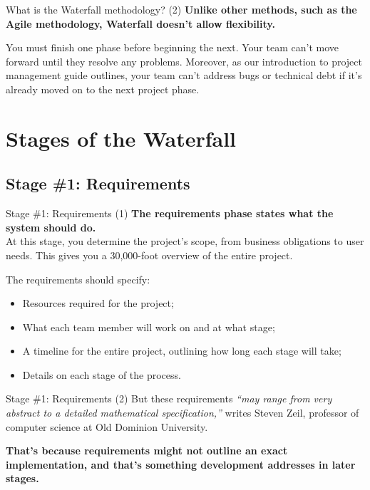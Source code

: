\documentclass[
    notheorems,
    11pt,
    compress,
    aspectratio=169
]{beamer}
\begin{document}
\begin{frame}{What is the Waterfall methodology? (2)}
    \textbf{Unlike other methods, such as the Agile methodology, Waterfall doesn’t allow flexibility.}

    \pause
    \vspace{\baselineskip}

    You must finish one phase before beginning the next. Your team can’t move forward until they resolve any problems. Moreover, as our introduction to project management guide outlines, your team can’t address bugs or technical debt if it’s already moved on to the next project phase.
\end{frame}


\section{Stages of the Waterfall}

\subsection{Stage \#1: Requirements}

\begin{frame}{Stage \#1: Requirements (1)}
    \textbf{The requirements phase states what the system should do.}
    \\
    At this stage, you determine the project’s scope, from business obligations to user needs. This gives you a 30,000-foot overview of the entire project.

    \pause
    \vfill

    The requirements should specify:

    \begin{itemize}
        \item Resources required for the project;
        \item What each team member will work on and at what stage;
        \item A timeline for the entire project, outlining how long each stage will take;
        \item Details on each stage of the process.
    \end{itemize}
\end{frame}

\begin{frame}{Stage \#1: Requirements (2)}
    But these requirements \textit{“may range from very abstract to a detailed mathematical specification,”} writes Steven Zeil, professor of computer science at Old Dominion University.

    \pause
    \vspace{\baselineskip}

    \textbf{That’s because requirements might not outline an exact implementation, and that’s something development addresses in later stages.}
\end{frame}
\end{document}
